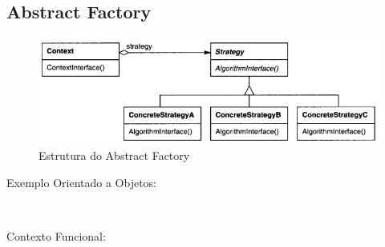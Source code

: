 \subsection{Abstract Factory}


\begin{figure}[htb]
	\caption{\label{fig_grafico}Estrutura do Abstract Factory}
	\begin{center}
	    \includegraphics[scale=0.5]{5_padroes-contexto-funcional/5.3_comportamentais/5.3.9_strategy/diagram.png}
	\end{center}
\end{figure}

Exemplo Orientado a Objetos:

\begin{lstlisting}[caption={Abstract Factory Orientação a Objetos},label=oostrategy]
    

\end{lstlisting}

Contexto Funcional:

\begin{lstlisting}[caption={Abstract Factory Orientação a Objetos},label=ooabfactory]
    
    

\end{lstlisting}